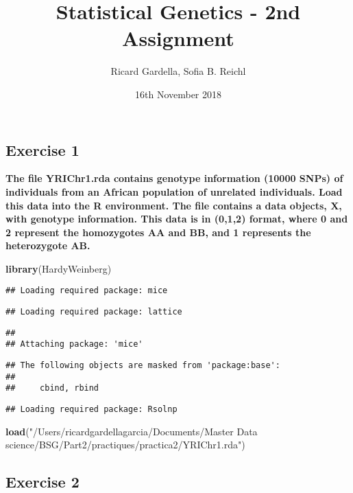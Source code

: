 \documentclass[]{article}
\title{Statistical Genetics - 2nd Assignment}
\author{Ricard Gardella, Sofia B. Reichl}
\date{16th November 2018}
\newenvironment{Shaded}{\begin{snugshade}}{\end{snugshade}}
\newcommand{\KeywordTok}[1]{\textcolor[rgb]{0.13,0.29,0.53}{\textbf{#1}}}
\newcommand{\StringTok}[1]{\textcolor[rgb]{0.31,0.60,0.02}{#1}}
\newcommand{\NormalTok}[1]{#1}
\begin{document}
\maketitle

\subsection{Exercise 1}\label{exercise-1}

\textbf{The file YRIChr1.rda contains genotype information (10000 SNPs)
of individuals from an African population of unrelated individuals. Load
this data into the R environment. The file contains a data objects, X,
with genotype information. This data is in (0,1,2) format, where 0 and 2
represent the homozygotes AA and BB, and 1 represents the heterozygote
AB.}

\begin{Shaded}
\begin{Highlighting}[]
\KeywordTok{library}\NormalTok{(HardyWeinberg)}
\end{Highlighting}
\end{Shaded}

\begin{verbatim}
## Loading required package: mice
\end{verbatim}

\begin{verbatim}
## Loading required package: lattice
\end{verbatim}

\begin{verbatim}
## 
## Attaching package: 'mice'
\end{verbatim}

\begin{verbatim}
## The following objects are masked from 'package:base':
## 
##     cbind, rbind
\end{verbatim}

\begin{verbatim}
## Loading required package: Rsolnp
\end{verbatim}

\begin{Shaded}
\begin{Highlighting}[]
\KeywordTok{load}\NormalTok{(}\StringTok{"/Users/ricardgardellagarcia/Documents/Master Data science/BSG/Part2/practiques/practica2/YRIChr1.rda"}\NormalTok{)}
\end{Highlighting}
\end{Shaded}

\subsection{Exercise 2}\label{exercise-2}
\end{document}

